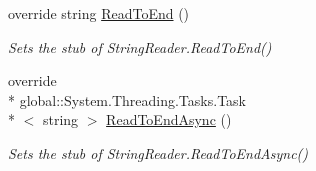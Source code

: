 \begin{DoxyCompactItemize}
override string \hyperlink{class_system_1_1_i_o_1_1_fakes_1_1_stub_string_reader_afcabde49db4dc4c8f98dc6d4d4276e7e}{Read\-To\-End} ()
\begin{DoxyCompactList}\small\item\em Sets the stub of String\-Reader.\-Read\-To\-End()\end{DoxyCompactList}\item 
override \\*
global\-::\-System.\-Threading.\-Tasks.\-Task\\*
$<$ string $>$ \hyperlink{class_system_1_1_i_o_1_1_fakes_1_1_stub_string_reader_a67daa12f839f7780c0664f9600c62af3}{Read\-To\-End\-Async} ()
\begin{DoxyCompactList}\small\item\em Sets the stub of String\-Reader.\-Read\-To\-End\-Async()\end{DoxyCompactList}\end{DoxyCompactItemize}
